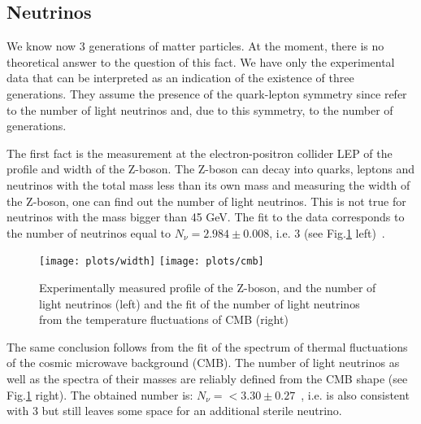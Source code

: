 \documentclass{cernyrep}
\begin{document}
\subsection{Neutrinos}
We know now  3 generations of matter particles. At the moment, there is no theoretical answer to the question of this fact.  We have only the experimental data that can be interpreted  as an indication of the existence of three generations. They assume the presence of the quark-lepton symmetry since refer to the number of light neutrinos and, due to this symmetry, to the number of generations. 

The first fact is the measurement at the electron-positron collider LEP of the profile and width of  the Z-boson. The Z-boson can decay into quarks, leptons and neutrinos with the total mass less than  its own mass and measuring the width of the Z-boson, one can find out the number of light neutrinos.  This is not true for neutrinos with the mass bigger than 45 GeV.  The fit to the data corresponds to the number of neutrinos equal to $N_\nu=2.984\pm0.008$, i.e. 3 (see  Fig.\ref{width} left)~\cite{Z}.
\begin{figure}[ht]
\begin{center}
\leavevmode
\texttt{[image: plots/width]}\hspace{1cm}
\texttt{[image: plots/cmb]}
\end{center}\caption{Experimentally measured profile of  the Z-boson, and the number of light  neutrinos (left) and the fit of the number of light neutrinos   from the temperature fluctuations of CMB (right)}
\label{width}
\end{figure}

The same conclusion follows from the fit of the spectrum of thermal fluctuations of the cosmic microwave background (CMB). The number of light neutrinos as well as the spectra of their masses are reliably defined from the CMB shape  (see Fig.\ref{width} right). The obtained number is:  $N_\nu= < 3.30\pm0.27$~\cite{CMBNeutrino2}, i.e. is also  consistent with 3 but still leaves some space for an additional sterile neutrino. 
\end{document}
